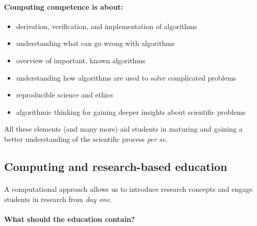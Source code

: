 \documentclass[%
twoside,                 %
final,                   %
10pt]{article}
\begin{document}
\paragraph{Computing competence is about:}

\begin{itemize}
\item derivation, verification, and implementation of algorithms

\item understanding what can go wrong with algorithms

\item overview of important, known algorithms

\item understanding how algorithms are used to solve complicated problems

\item reproducible science and ethics

\item algorithmic thinking for gaining deeper insights about scientific problems
\end{itemize}

\noindent
All these elements (and many more) aid students in maturing and gaining a better understanding of the scientific process \emph{per se}.







\subsection*{Computing and research-based education}


\paragraph{}
A computational approach allows us to introduce research concepts and engage students in research from \emph{day one}.





\paragraph{What should the education contain?}
\end{document}
